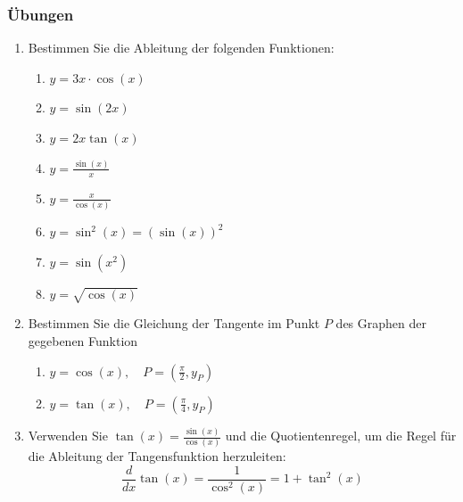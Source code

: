 \clearpage
\subsubsection*{Übungen}
\begin{enumerate}
    \item Bestimmen Sie die Ableitung der folgenden Funktionen:
          \begin{enumerate}
              \item $y= 3x\cdot \cos(x)$
              \item $y= \sin(2x)$
              \item $y= 2x\tan(x)$
              \item $y= \frac{\sin(x)}{x}$
              \item $ y= \frac{x}{\cos(x)}$
              \item $y =\sin^2(x) = (\sin(x))^2$
              \item $y = \sin(x^2)$
              \item $y=\sqrt{\cos(x)}$
          \end{enumerate}
    \item Bestimmen Sie die Gleichung der Tangente im Punkt $P$ des Graphen der gegebenen Funktion
          \begin{enumerate}
              \item $ y= \cos(x), \quad P=\left(\frac{\pi}{2}, y_P\right)$
              \item $ y= \tan(x), \quad P=\left(\frac{\pi}{4}, y_P\right)$
          \end{enumerate}
    \item Verwenden Sie $\tan(x) = \frac{\sin(x)}{\cos(x)}$ und die Quotientenregel, um die Regel für die Ableitung der Tangensfunktion herzuleiten:
          $$
              \frac{d}{dx}\tan(x) = \frac{1}{\cos^2(x)} = 1+ \tan^2(x)
          $$
\end{enumerate}
\clearpage
